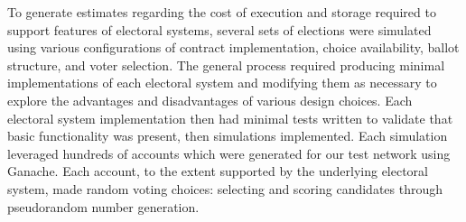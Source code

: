 To generate estimates regarding the cost of execution and storage required to
support features of electoral systems, several sets of elections were simulated
using various configurations of contract implementation, choice availability,
ballot structure, and voter selection. The general process required producing
minimal implementations of each electoral system and modifying them as necessary
to explore the advantages and disadvantages of various design choices. Each
electoral system implementation then had minimal tests written to validate that
basic functionality was present, then simulations implemented. Each simulation
leveraged hundreds of accounts which were generated for our test network using
Ganache. Each account, to the extent supported by the underlying electoral
system, made random voting choices: selecting and scoring candidates through
pseudorandom number generation.

